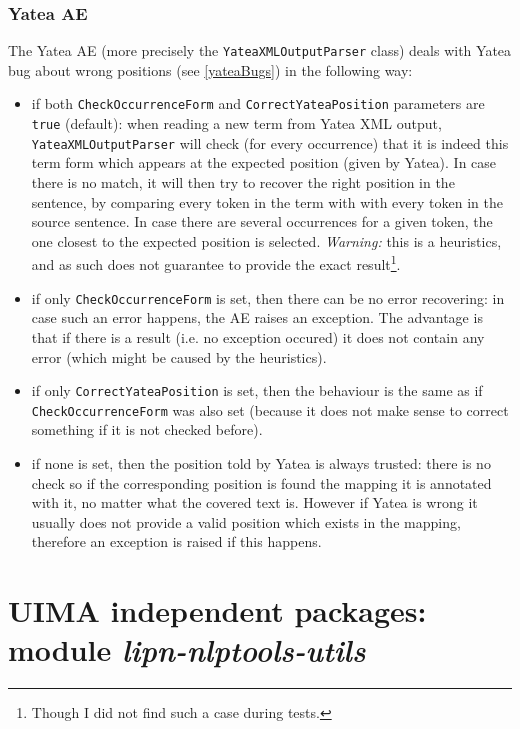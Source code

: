 \documentclass{article}
\newcommand{\utilsModule}{{\em lipn-nlptools-utils}\xspace}
\begin{document}
\subsubsection{Yatea AE}
\label{yateaAE}
The Yatea AE (more precisely the {\tt YateaXMLOutputParser} class) deals with Yatea bug about wrong positions (see \ref{yateaBugs}) in the following way:
\begin{itemize}
\item if both {\tt CheckOccurrenceForm} and {\tt CorrectYateaPosition} parameters are {\tt true} (default): when reading a new term from Yatea XML output, {\tt YateaXMLOutputParser} will check (for every occurrence) that it is indeed this term form which appears at the expected position (given by Yatea). In case there is no match, it will then try to recover the right position in the sentence, by comparing every token in the term with with every token in the source sentence. In case there are several occurrences for a given token, the one closest to the expected position is selected. {\em Warning:} this is a heuristics, and as such does not guarantee to provide the exact result\footnote{Though I did not find such a case during tests.}.
\item if only {\tt CheckOccurrenceForm} is set, then there can be no error recovering: in case such an error happens, the AE raises an exception. The advantage is that if there is a result (i.e. no exception occured) it does not contain any error (which might be caused by the heuristics).
\item if only {\tt CorrectYateaPosition} is set, then the behaviour is the same as if {\tt CheckOccurrenceForm} was also set (because it does not make sense to correct something if it is not checked before).
\item if none is set, then the position told by Yatea is always trusted: there is no check so if the corresponding position is found the mapping it is annotated with it, no matter what the covered text is. However if Yatea is wrong it usually does not provide a valid position which exists in the mapping, therefore an exception is raised if this happens.
\end{itemize}




\section{UIMA independent packages: module \utilsModule}
\label{partUimaIndependentCode}
\end{document}
